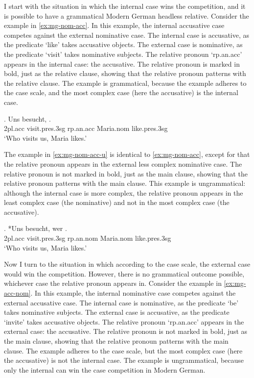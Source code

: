 I start with the situation in which the internal case wins the competition, and it is possible to have a grammatical Modern German headless relative.
Consider the example in \ref{ex:mg-nom-acc}. In this example, the internal accusative case competes against the external nominative case.
The internal case is accusative, as the predicate  `like' takes accusative objects.
The external case is nominative, as the predicate  `visit' takes nominative subjects.
The relative pronoun  `\ac{rp}.\ac{an}.\ac{acc}' appears in the internal case: the accusative. The relative pronoun is marked in bold, just as the relative clause, showing that the relative pronoun patterns with the relative clause.
The example is grammatical, because the example adheres to the case scale, and the most complex case (here the accusative) is the internal case.

\exg. Uns besucht,   .\\
 2\ac{pl}.\ac{acc} visit.\ac{pres}.3\ac{sg}\scsub{[nom]} \ac{rp}.\ac{an}.\ac{acc} Maria.\ac{nom} like.\ac{pres}.3\ac{sg}\scsub{[acc]}\\
 `Who visits us, Maria likes.' \label{ex:mg-nom-acc}

The example in \ref{ex:mg-nom-acc-u} is identical to \ref{ex:mg-nom-acc}, except for that the relative pronoun appears in the external less complex nominative case.
The relative pronoun is not marked in bold, just as the main clause, showing that the relative pronoun patterns with the main clause.
This example is ungrammatical: although the internal case is more complex, the relative pronoun appears in the least complex case (the nominative) and not in the most complex case (the accusative).

\exg. *Uns besucht, wer  .\\
 2\ac{pl}.\ac{acc} visit.\ac{pres}.3\ac{sg}\scsub{[nom]} \ac{rp}.\ac{an}.\ac{nom} Maria.\ac{nom} like.\ac{pres}.3\ac{sg}\scsub{[acc]}\\
 `Who visits us, Maria likes.' \label{ex:mg-nom-acc-u}

Now I turn to the situation in which according to the case scale, the external case would win the competition. However, there is no grammatical outcome possible, whichever case the relative pronoun appears in.
Consider the example in \ref{ex:mg-acc-nom}. In this example, the internal nominative case competes against the external accusative case.
The internal case is nominative, as the predicate  `be' takes nominative subjects.
The external case is accusative, as the predicate  `invite' takes accusative objects.
The relative pronoun  `\ac{rp}.\ac{an}.\ac{acc}' appears in the external case: the accusative. The relative pronoun is not marked in bold, just as the main clause, showing that the relative pronoun patterns with the main clause.
The example adheres to the case scale, but the most complex case (here the accusative) is not the internal case. The example is ungrammatical, because only the internal can win the case competition in Modern German.

